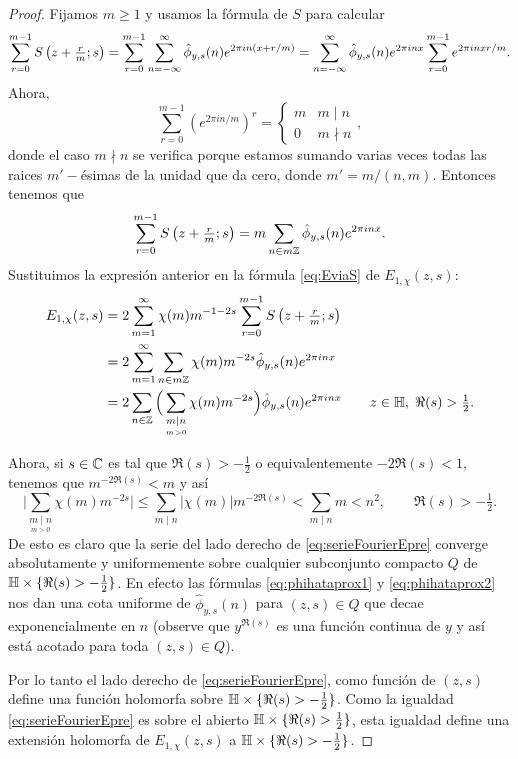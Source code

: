 \documentclass[../../tesis_maestria]{subfiles}
\begin{document}
\begin{proof}
  Fijamos $m\geq1$ y usamos la f\'ormula de $S$ para calcular
  \[
    \sum_{r=0}^{m-1}S\left( z+\tfrac{r}{m};s \right)
    =\sum_{r=0}^{m-1}\sum_{n=-\infty}^{\infty}\hat{\phi}_{y,s}(n)e^{2\pi in(x+r/m)}
    =\sum_{n=-\infty}^{\infty}\hat{\phi}_{y,s}(n)e^{2\pi inx}\sum_{r=0}^{m-1}e^{2\pi inxr/m}.
  \]
  Ahora,
  \[
    \sum_{r=0}^{m-1}(e^{2\pi in/m})^r=
    \begin{cases}
      m & m\mid n\\
      0 & m\nmid n
    \end{cases},
  \]
  donde el caso $m\nmid n$ se verifica porque estamos sumando varias veces todas
  las raices $m'-$\'esimas de la unidad que da cero, donde $m'=m/(n,m)$. Entonces tenemos que
  \[
    \sum_{r=0}^{m-1}S\left( z+\tfrac{r}{m};s \right)=m\sum_{n\in m\mathbb{Z}}\hat{\phi}_{y,s}(n)e^{2\pi inx}.
  \]
  Sustituimos la expresi\'on anterior en la f\'ormula \eqref{eq:EviaS} de
  $E_{1,\chi}(z,s)$:
  \begin{align}
    E_{1,\chi}(z,s)
    &=2\sum_{m=1}^{\infty}\chi(m)m^{-1-2s}\sum_{r=0}^{m-1}S\left( z+\tfrac{r}{m};s \right)\nonumber\\
    &=2\sum_{m=1}^{\infty}\sum_{n\in m\mathbb{Z}}\chi(m)m^{-2s}\hat{\phi}_{y,s}(n)e^{2\pi inx}\nonumber\\
    &=2\sum_{n\in\mathbb{Z}}\Big(\sum_{\underset{m>0}{m\mid n}}\chi(m)m^{-2s}\Big)\hat{\phi}_{y,s}(n)e^{2\pi inx}
      \qquad z\in\mathbb{H},\;\Re(s)>\tfrac{1}{2}.\label{eq:serieFourierEpre}
  \end{align}

  Ahora, si $s\in\mathbb{C}$ es tal que $\Re(s)>-\tfrac{1}{2}$ o equivalentemente $-2\Re(s)<1$,
  tenemos que $m^{-2\Re(s)}<m$ y as\'i
  \[
    \Big| \sum_{\underset{m>0}{m\mid n}}\chi(m)m^{-2s} \Big|\leq
    \sum_{m\mid n}|\chi(m)|m^{-2\Re(s)}<\sum_{m\mid n}m<n^2,\qquad\Re(s)>-\tfrac{1}{2}.
  \]
  De esto es claro que la serie del lado derecho de \eqref{eq:serieFourierEpre}
  converge absolutamente y uniformemente sobre cualquier subconjunto compacto $Q$
  de $\mathbb{H}\times\{\Re(s)>-\tfrac{1}{2}\}$. En efecto las f\'ormulas \eqref{eq:phihataprox1}
  y \eqref{eq:phihataprox2} nos dan una cota uniforme de $\hat{\phi}_{y,s}(n)$ para $(z,s)\in Q$
  que decae exponencialmente en $n$ (observe que $y^{\Re(s)}$ es una funci\'on continua
  de $y$ y as\'i est\'a acotado para toda $(z,s)\in Q$).

  Por lo tanto el lado derecho de \eqref{eq:serieFourierEpre}, como funci\'on de
  $(z,s)$ define una funci\'on  holomorfa sobre $\mathbb{H}\times\{\Re(s)>-\tfrac{1}{2}\}$.
  Como la igualdad \eqref{eq:serieFourierEpre} es sobre el abierto
  $\mathbb{H}\times\{\Re(s)>\tfrac{1}{2}\}$, esta igualdad define una extensi\'on holomorfa
  de $E_{1,\chi}(z,s)$ a $\mathbb{H}\times\{\Re(s)>-\tfrac{1}{2}\}$.


\end{proof}
\end{document}
